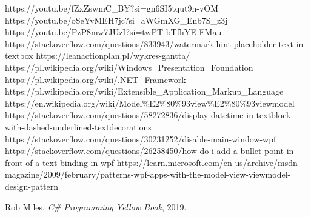 \documentclass[polish,12pt,twoside,a4paper]{report}
\begin{document}




\newpage

\newpage

\newpage

\newpage

\newpage

\newpage

\begin{thebibliography}{6}

 https://youtu.be/fZxZswmC\_BY?si=gn6SI5tqut9n-vOM
 https://youtu.be/oSeYvMEH7jc?si=aWGmXG\_Enb7S\_z3j
 https://youtu.be/PzP8mw7JUzI?si=twPT-bTfhYE-FMau
https://stackoverflow.com/questions/833943/watermark-hint-placeholder-text-in-textbox
https://leanactionplan.pl/wykres-gantta/
https://pl.wikipedia.org/wiki/Windows\_Presentation\_Foundation
https://pl.wikipedia.org/wiki/.NET\_Framework
https://pl.wikipedia.org/wiki/Extensible\_Application\_Markup\_Language
https://en.wikipedia.org/wiki/Model\%E2\%80\%93view\%E2\%80\%93viewmodel
https://stackoverflow.com/questions/58272836/display-datetime-in-textblock-with-dashed-underlined-textdecorations
https://stackoverflow.com/questions/30231252/disable-main-window-wpf
https://stackoverflow.com/questions/26258450/how-do-i-add-a-bullet-point-in-front-of-a-text-binding-in-wpf
 https://learn.microsoft.com/en-us/archive/msdn-magazine/2009/february/patterns-wpf-apps-with-the-model-view-viewmodel-design-pattern

Rob Miles, {\it C\# Programming Yellow Book}, 2019.
\end{thebibliography}
\newpage


\end{document}
